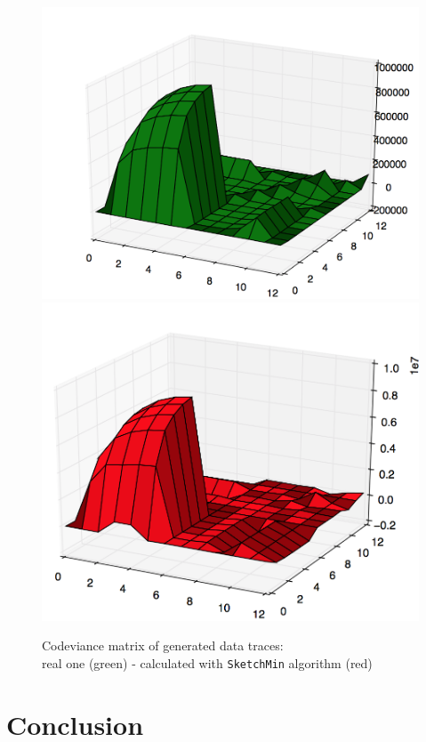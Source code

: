 \documentclass[a4paper]{article}%
\begin{document}
\begin{figure}[H]
	\centering
	\includegraphics[scale=0.23]{generated_real.png}
	\includegraphics[scale=0.23]{generated_sk.png}
	\caption{Codeviance matrix of generated data traces:\\real one (green) - calculated with \texttt{SketchMin} algorithm (red)}
	\label{ref:exp_artificial}
\end{figure}


\section*{Conclusion}

\clearpage
\end{document}
